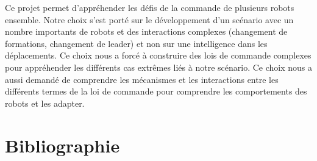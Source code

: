 \documentclass[a4paper,12pt]{article}
\begin{document}
Ce projet permet d'appréhender les défis de la commande de plusieurs robots ensemble. Notre choix s'est porté sur le développement d'un scénario avec un nombre importants de robots et des interactions complexes (changement de formations, changement de leader) et non sur une intelligence dans les déplacements. Ce choix nous a forcé à construire des lois de commande complexes pour appréhender les différents cas extrêmes liés à notre scénario. Ce choix nous a aussi demandé de comprendre les mécanismes et les interactions entre les différents termes de la loi de commande pour comprendre les comportements des robots et les adapter.

\newpage
\section*{Bibliographie}
\printbibliography[heading=none]
\end{document}
